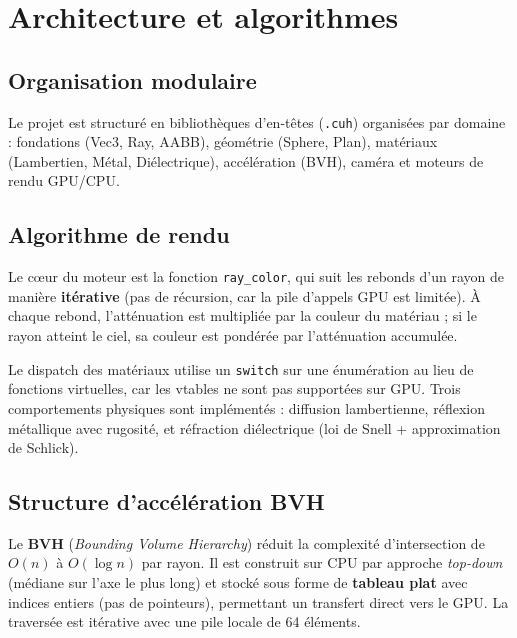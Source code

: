 \documentclass[12pt,a4paper]{article}
\begin{document}
\section{Architecture et algorithmes}

\subsection{Organisation modulaire}

Le projet est structuré en bibliothèques d'en-têtes (\texttt{.cuh}) organisées par domaine : fondations (Vec3, Ray, AABB), géométrie (Sphere, Plan), matériaux (Lambertien, Métal, Diélectrique), accélération (BVH), caméra et moteurs de rendu GPU/CPU.

\subsection{Algorithme de rendu}

Le cœur du moteur est la fonction \texttt{ray\_color}, qui suit les rebonds d'un rayon de manière \textbf{itérative} (pas de récursion, car la pile d'appels GPU est limitée). À chaque rebond, l'atténuation est multipliée par la couleur du matériau ; si le rayon atteint le ciel, sa couleur est pondérée par l'atténuation accumulée.

Le dispatch des matériaux utilise un \texttt{switch} sur une énumération au lieu de fonctions virtuelles, car les vtables ne sont pas supportées sur GPU. Trois comportements physiques sont implémentés : diffusion lambertienne, réflexion métallique avec rugosité, et réfraction diélectrique (loi de Snell + approximation de Schlick).

\subsection{Structure d'accélération BVH}

Le \textbf{BVH} (\textit{Bounding Volume Hierarchy}) réduit la complexité d'intersection de $O(n)$ à $O(\log n)$ par rayon. Il est construit sur CPU par approche \textit{top-down} (médiane sur l'axe le plus long) et stocké sous forme de \textbf{tableau plat} avec indices entiers (pas de pointeurs), permettant un transfert direct vers le GPU. La traversée est itérative avec une pile locale de 64 éléments.
\end{document}
